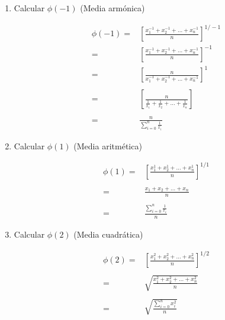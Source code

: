 \documentclass[a4paper,12pt]{article}
\begin{document}
\begin{enumerate}{}
    \item Calcular $\phi(-1)$ (Media armónica)
    
    \[\begin{array}{rl}
       \phi(-1) = &  \displaystyle \left[\frac{x_{1}^{-1}+x_{2}^{-1}+\ldots+x_{n}^{-1}}{n}\right]^{1/-1}\\
       = & \displaystyle \left[\frac{x_{1}^{-1}+x_{2}^{-1}+\ldots+x_{n}^{-1}}{n}\right]^{-1}\\
       = & \displaystyle \left[\frac{n}{x_{1}^{-1}+x_{2}^{-1}+\ldots+x_{n}^{-1}}\right]^{1}\\\\
       = & \displaystyle \left[\frac{n}{\displaystyle \frac{1}{x_{1}} + \frac{1}{x_{2}}+\ldots+ \frac{1}{x_{n}}}\right] \\\\
       = & \displaystyle \frac{n}{\displaystyle\sum_{i=0}^{n}\frac{1}{x_{i}}}
    \end{array}\]
    
    \item Calcular $\phi(1)$ (Media aritmética)
    
        \[\begin{array}{rl}
            \phi(1) = &  \displaystyle \left[\frac{x_{1}^{1}+x_{2}^{1}+\ldots+x_{n}^{1}}{n}\right]^{1/1}\\\\
             = & \displaystyle \frac{x_{1}+x_{2}+\ldots+x_{n}}{n}\\\\  
             = & \displaystyle\frac{\displaystyle\sum_{i=0}^{n}\frac{1}{x_{i}}}{n}
        \end{array}\]
    
    \item Calcular $\phi(2)$ (Media cuadrática)
    
        \[\begin{array}{rl}
            \phi(2) = &  \displaystyle \left[\frac{x_{1}^{2}+x_{2}^{2}+\ldots+x_{n}^{2}}{n}\right]^{1/2}\\\\
             = & \sqrt{\displaystyle \frac{x_{1}^{2}+x_{2}^{2}+\ldots+x_{n}^{2}}{n}}\\\\ 
             = & \displaystyle\sqrt{ \frac{\sum_{i=0}^{n}x_{i}^{2}}{n}}
        \end{array}\]
    

\end{enumerate}
\end{document}
